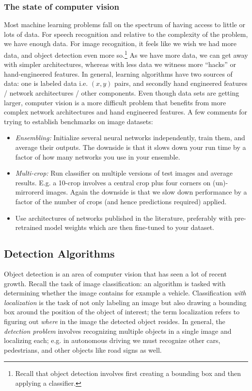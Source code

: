 \documentclass[12pt]{article}
\begin{document}
\subsubsection{The state of computer vision} Most machine learning problems fall on the spectrum of having access to little or lots of data. For speech recognition and relative to the complexity of the problem, we have enough data. For image recognition, it feels like we wish we had more data, and object detection even more so.\footnote{Recall that object detection involves first creating a bounding box and then applying a classifier.} As we have more data, we can get away with simpler architectures, whereas with less data we witness more ``hacks'' or hand-engineered features. In general, learning algorithms have two sources of data: one is labeled data i.e. $(x,y)$ pairs, and secondly hand engineered features / network architectures / other components. Even though data sets are getting larger, computer vision is a more difficult problem that benefits from more complex network architectures and hand engineered features. A few comments for trying to establish benchmarks on image datasets:
\begin{itemize}
\item \emph{Ensembling:}
  Initialize several neural networks independently, train them,
  and average their outputs. The downside is that it slows down your run time by         a factor of how many networks you use in your ensemble.
\item \emph{Multi-crop:} Run classifier on multiple versions of test images and average results. E.g. a 10-crop involves a central crop plus four corners on (un)-mirrorerd images. Again the downside is that we slow down performance
by a factor of the number of crops (and hence predictions required) applied.
\item Use architectures of networks published in the literature, preferably with pre-retrained model weights which are then fine-tuned to your dataset.
\end{itemize}

\subsection{Detection Algorithms} Object detection is an area of computer vision that has seen a lot of recent growth. Recall the task of image classification:
an algorithm is tasked with determining whether the image contains for example a vehicle. Classification \emph{with localization} is the task of not only labeling an image but also drawing a bounding box around the position of the object of interest; the term localization refers to figuring out \emph{where} in the image the detected object resides. In general, the \emph{detection problem} involves recognizing multiple objects in a single image and localizing each; e.g. in autonomous driving we must recognize other cars, pedestrians, and other objects like road signs as well.
\end{document}
